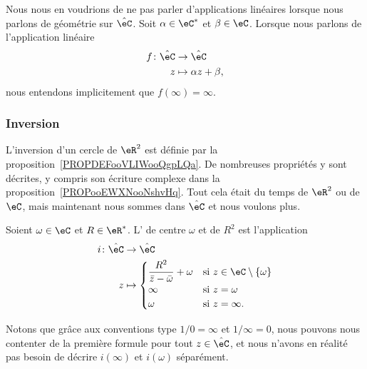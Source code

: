 Nous nous en voudrions de ne pas parler d'applications linéaires lorsque nous parlons de géométrie sur \( \hat \eC\). Soit \( \alpha\in \eC^*\) et \( \beta\in \eC\). Lorsque nous parlons de l'application linéaire
\begin{equation}
	\begin{aligned}
		f\colon \hat\eC & \to \hat\eC             \\
		z               & \mapsto \alpha z+\beta,
	\end{aligned}
\end{equation}
nous entendons implicitement que \( f(\infty)=\infty\).

\subsubsection{Inversion}
\label{SSUBSooPOUNooTPilbE}

L'inversion d'un cercle de \( \eR^2\) est définie par la proposition~\ref{PROPDEFooVLIWooQgpLQa}. De nombreuses propriétés y sont décrites, y compris son écriture complexe dans la proposition~\ref{PROPooEWXNooNshvHq}. Tout cela était du temps de \( \eR^2\) ou de \( \eC\), mais maintenant nous sommes dans \( \hat \eC\) et nous voulons plus.

\begin{definition}       \label{DEFooIUTZooWRaXts}
	Soient \( \omega\in \eC\) et \( R\in \eR^*\). L' de centre \( \omega\) et de  \( R^2\) est l'application
	\begin{equation}
		\begin{aligned}
			i\colon \hat \eC & \to \hat \eC                       \\
			z                & \mapsto \begin{cases}
				\dfrac{ R^2 }{ \bar z-\bar \omega }+\omega & \text{si } z\in \eC\setminus\{ \omega \} \\
				\infty                                     & \text{si } z=\omega                      \\
				\omega                                     & \text{si } z=\infty.
			\end{cases}
		\end{aligned}
	\end{equation}
\end{definition}
Notons que grâce aux conventions type \( 1/0=\infty\) et \( 1/\infty=0\), nous pouvons nous contenter de la première formule pour tout \( z\in \hat \eC\), et nous n'avons en réalité pas besoin de décrire \( i(\infty)\) et \( i(\omega)\) séparément.

